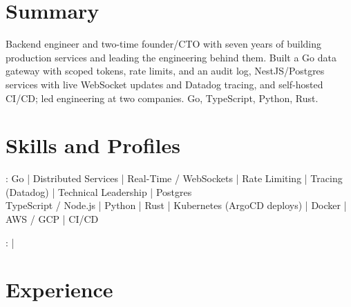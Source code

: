 \documentclass[print]{jack-resume}
\begin{document}
\pagecolor{darkmodeBackground}


\begin{minipage}[t][1cm][t]{.03\textwidth}
    \hfill
\end{minipage}

\section{Summary}
Backend engineer and two-time founder/CTO with seven years of building production services and leading the engineering behind them. Built a Go data gateway with scoped tokens, rate limits, and an audit log, NestJS/Postgres services with live WebSocket updates and Datadog tracing, and self-hosted CI/CD; led engineering at two companies. Go, TypeScript, Python, Rust.
\sectionsep

\section{Skills and Profiles}
:
Go \hfill | \hfill
Distributed Services \hfill | \hfill
Real-Time / WebSockets \hfill | \hfill
Rate Limiting \hfill | \hfill
Tracing (Datadog) \hfill | \hfill
Technical Leadership \hfill | \hfill
Postgres \\
\hspace{1.0cm} TypeScript / Node.js \hfill | \hfill
Python \hfill | \hfill
Rust \hfill | \hfill
Kubernetes (ArgoCD deploys) \hfill | \hfill
Docker \hfill | \hfill
AWS / GCP \hfill | \hfill
CI/CD \\

\raggedright{
    :
      \href{https://www.linkedin.com/in/jack-sturtevant/}{ \ExternalLink} |
     \href{https://github.com/jacksturt}{ \ExternalLink}}

\section{Experience}
\end{document}
